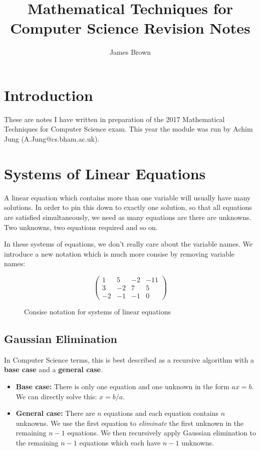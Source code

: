 \documentclass{article}
\title{Mathematical Techniques for Computer Science \linebreak Revision Notes}
\author{James Brown}
\begin{document}
	\maketitle
	\newpage
	\tableofcontents
	\newpage

	\section{Introduction}
	These are notes I have written in preparation of the 2017 Mathematical Techniques for Computer Science exam. This year the module was run by Achim Jung (A.Jung@cs.bham.ac.uk).
	
	\section{Systems of Linear Equations}
	A linear equation which contains more than one variable will usually have many solutions. In order to pin this down to exactly one solution, so that all equations are satisfied simultaneously, we need as many equations are there are unknowns. Two unknowns, two equations required and so on.
	
	In these systems of equations, we don't really care about the variable names. We introduce a new notation which is much more consise by removing variable names:
	
	\begin{figure}[ht]
	\[\left(
	\begin{array}{ccc|c}
			1 & 5 & -2 & -11 \\
			3 & -2 & 7 & 5 \\
			-2 & -1 & -1 & 0
		\end{array}
		\right) \]
		\caption{Consise notation for systems of linear equations}
		\label{fig:notation linear equations}
	\end{figure}
	
	\subsection{Gaussian Elimination}
	In Computer Science terms, this is best described as a recursive algorithm with a \textbf{base case} and a \textbf{general case}.
	
	\begin{itemize}
		\item \textbf{Base case:} There is only one equation and one unknown in the form $ax = b$. We can directly solve this: $x = b/a$.
		\item \textbf{General case:} There are $n$ equations and each equation contains $n$ unknowns. We use the first equation to \textit{eliminate} the first unknown in the remaining $n-1$ equations. We then recursively apply Gaussian elimination to the remaining $n-1$ equations which each have $n-1$ unknowns.
	\end{itemize}
	
\end{document}
